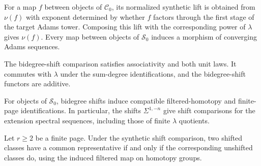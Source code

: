 \begin{definition}
\label{sem:AdamsSynthetic:normalized-map}
For a map $f$ between objects of $\mathcal C_0$, its normalized synthetic lift is obtained from $\nu(f)$ with exponent determined by whether $f$ factors through the first stage of the target Adams tower. Composing this lift with the corresponding power of $\lambda$ gives $\nu(f)$. Every map between objects of $\mathcal S_0$ induces a morphism of converging Adams sequences.
\end{definition}

\begin{theorem}
\label{sem:AdamsSynthetic:shift-coherence}
The bidegree-shift comparison satisfies associativity and both unit laws. It commutes with $\lambda$ under the sum-degree identifications, and the bidegree-shift functors are additive.
\end{theorem}

\begin{definition}
\label{sem:AdamsSynthetic:ess-shifts}
For objects of $\mathcal S_0$, bidegree shifts induce compatible filtered-homotopy and finite-page identifications. In particular, the shifts $\Sigma^{1,-n}$ give shift comparisons for the extension spectral sequences, including those of finite $\lambda$ quotients.
\end{definition}

\begin{theorem}
\label{sem:AdamsSynthetic:shift-representatives}
Let $r\geq2$ be a finite page. Under the synthetic shift comparison, two shifted classes have a common representative if and only if the corresponding unshifted classes do, using the induced filtered map on homotopy groups.
\end{theorem}
